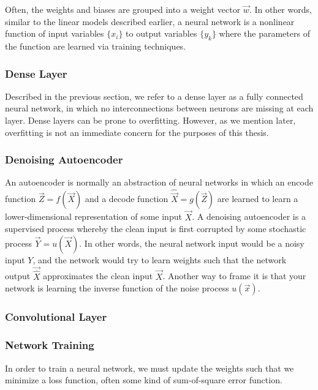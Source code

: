 Often, the weights and biases are grouped into a weight vector $\vec{w}$. In other words, similar to the linear models described earlier, a neural network is a nonlinear function of input variables $\{x_i\}$ to output variables $\{y_k\}$ where the parameters of the function are learned via training techniques.

\subsubsection{Dense Layer}

Described in the previous section, we refer to a dense layer as a fully connected neural network, in which no interconnections between neurons are missing at each layer. Dense layers can be prone to overfitting. However, as we mention later, overfitting is not an immediate concern for the purposes of this thesis.

\subsubsection{Denoising Autoencoder}

An autoencoder is normally an abstraction of neural networks in which an encode function $\vec{Z}=f(\vec{X})$ and a decode function $\hat{\vec{X}}=g(\vec{Z})$ are learned to learn a lower-dimensional representation of some input $\vec{X}$. \cite{stow} A denoising autoencoder is a supervised process whereby the clean input is first corrupted by some stochastic process $\vec{Y}=u(\vec{X})$. In other words, the neural network input would be a noisy input $Y$, and the network would try to learn weights such that the network output $\vec{\hat{X}}$ approximates the clean input $\vec{X}$. Another way to frame it is that your network is learning the inverse function of the noise process $u(\vec{x})$.

\subsubsection{Convolutional Layer}



\subsubsection{Network Training}

In order to train a neural network, we must update the weights such that we minimize a loss function, often some kind of sum-of-square error function. \cite{bishop}



